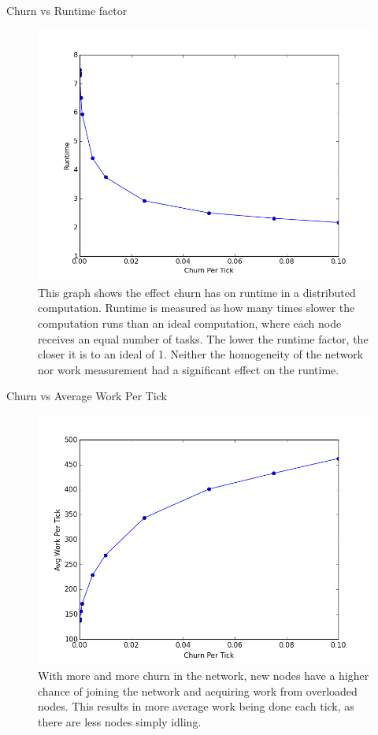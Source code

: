 \documentclass[11pt]{beamer}
\begin{document}
\begin{frame}{Churn vs Runtime factor}
	\begin{figure}[h]
		\centering
		\includegraphics[width=0.7\linewidth]{figs/churnVsTime}
		\caption[Churn vs Runtime factor]{This graph shows the effect churn has on runtime in a distributed computation.
			Runtime is measured as how many times slower the computation runs than an ideal computation, where each node receives an equal number of tasks.
			The lower the runtime factor, the closer it is to an ideal of 1.
			Neither the homogeneity of the network nor work measurement had a significant effect on the runtime.}
		\label{fig:churnVsTime}
	\end{figure}
\end{frame}


\begin{frame}{Churn vs Average Work Per Tick}
\begin{figure}
	\centering
	\includegraphics[width=0.7\linewidth]{figs/churnVsWork}
	\caption[Churn vs average work per tick]{With more and more churn in the network, new nodes have a higher chance of joining the network and acquiring work from overloaded nodes.  This results in more average work being done each tick, as there are less nodes simply idling.}
	\label{fig:churnVsWork}
\end{figure}

\end{frame}
\end{document}
